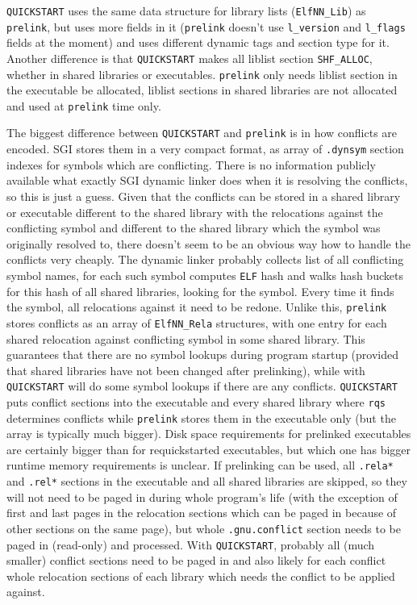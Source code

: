 \documentclass[twoside]{article}
\def\tts#1{\texttt{\small #1}}
\begin{document}
\tts{QUICKSTART} uses the same data structure for library lists
(\tts{ElfNN\_Lib}) as \tts{prelink}, but uses more fields in it
(\tts{prelink} doesn't use \tts{l\_version} and \tts{l\_flags} fields at
the moment) and uses different dynamic tags and section type for
it.  Another difference is that \tts{QUICKSTART} makes all liblist
section \tts{SHF\_ALLOC}, whether in shared libraries or executables.
\tts{prelink} only needs liblist section in the executable be allocated,
liblist sections in shared libraries are not allocated and used
at \tts{prelink} time only.

The biggest difference between \tts{QUICKSTART} and \tts{prelink}
is in how conflicts are encoded.  SGI stores them in a very compact
format, as array of \tts{.dynsym} section indexes for symbols which
are conflicting.  There is no information publicly available
what exactly SGI dynamic linker does when it is resolving the conflicts,
so this is just a guess.  Given that the conflicts can be stored
in a shared library or executable different to the shared library with the
relocations against the conflicting symbol and different to the shared
library which the symbol was originally resolved to, there doesn't seem
to be an obvious way how to handle the conflicts very cheaply.
The dynamic linker probably collects list of all conflicting symbol
names, for each such symbol computes \tts{ELF} hash and walks hash buckets
for this hash of all shared libraries, looking for the symbol.
Every time it finds the symbol, all relocations against it need to be
redone.  Unlike this, \tts{prelink} stores conflicts as an array of
\tts{ElfNN\_Rela} structures, with one entry for each shared relocation
against conflicting symbol in some shared library.  This guarantees
that there are no symbol lookups during program startup (provided
that shared libraries have not been changed after prelinking), while
with \tts{QUICKSTART} will do some symbol lookups if there are any
conflicts.  \tts{QUICKSTART} puts conflict sections into the executable
and every shared library where \tts{rqs} determines conflicts while
\tts{prelink} stores them in the executable only (but the array is typically
much bigger).  Disk space requirements for prelinked executables are certainly
bigger than for requickstarted executables, but which one has bigger runtime
memory requirements is unclear.  If prelinking can be used, all \tts{.rela*}
and \tts{.rel*} sections in the executable and all shared libraries are skipped,
so they will not need to be paged in during whole program's life (with the
exception of first and last pages in the relocation sections which can be
paged in because of other sections on the same page), but whole
\tts{.gnu.conflict} section needs to be paged in (read-only) and processed.
With \tts{QUICKSTART}, probably all (much smaller) conflict sections need
to be paged in and also likely for each conflict whole relocation sections
of each library which needs the conflict to be applied against.
\end{document}

